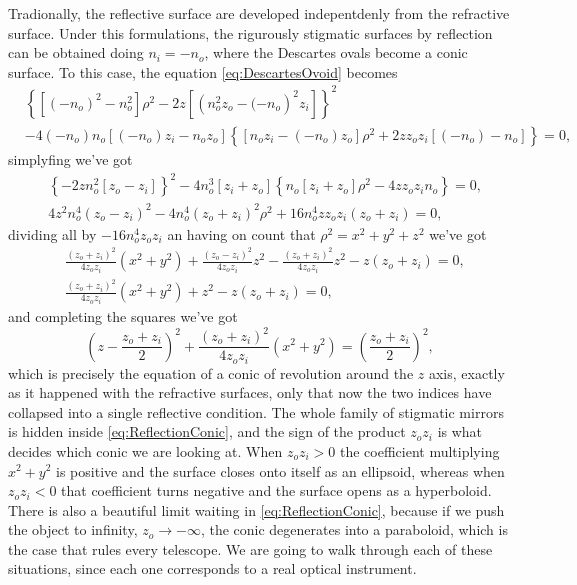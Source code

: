                 Tradionally, the reflective surface are developed indepentdenly from the refractive surface. Under this formulations, the rigurously stigmatic surfaces by reflection can be obtained doing $n_i = -n_o$, where the Descartes ovals become a conic surface. To this case, the equation \ref{eq:DescartesOvoid} becomes
                \begin{align*}
                    & \left\{ \left[\left(-n_o\right)^2-n_o^2 \right]\rho^2 - 2z\left[\left( n_o^2z_o- (-n_o\right)^2z_i  \right] \right\}^2 \\
                    & -4(-n_o)n_o\left[(-n_o)z_i -n_oz_o \right]\left\{\left[n_oz_i - (-n_o)z_o \right]\rho^2 + 2zz_oz_i\left[(-n_o) - n_o \right]  \right\}=0,
                \end{align*}
                simplyfing we've got
                \begin{align*}
                    & \left\{ -2zn_o^2\left[z_o-z_i\right] \right\}^2 -4n_o^3\left[z_i+z_o\right]\left\{n_o\left[z_i+z_o \right]\rho^2 - 4zz_oz_in_o \right\} = 0,\\
                    & 4z^2n_o^4\left(z_o-z_i\right)^2 - 4n_o^4\left(z_o+z_i\right)^2\rho^2 + 16n_o^4zz_oz_i\left(z_o+z_i\right) = 0,
                \end{align*}
                dividing all by $-16n_o^4z_oz_i$ an having on count that $\rho^2 = x^2+y^2+z^2$ we've got
                \begin{align*}
                    & \frac{(z_o+z_i)^2}{4z_oz_i}\left(x^2+y^2\right) + \frac{(z_o-z_i)^2}{4z_oz_i}z^2 - \frac{(z_o+z_i)^2}{4z_oz_i}z^2 - z(z_o+z_i) = 0,\\
                    & \frac{(z_o+z_i)^2}{4z_oz_i}\left(x^2+y^2\right) +z^2 - z(z_o+z_i) = 0,
                \end{align*}
                and completing the squares we've got
                \begin{equation}\label{eq:ReflectionConic}
                    \left(z - \frac{z_o+z_i}{2}\right)^2 + \frac{(z_o+z_i)^2}{4z_oz_i}\left(x^2+y^2\right) = \left(\frac{z_o+z_i}{2}\right)^2,
                \end{equation}
                which is precisely the equation of a conic of revolution around the $z$ axis, exactly as it happened with the refractive surfaces, only that now the two indices have collapsed into a single reflective condition. The whole family of stigmatic mirrors is hidden inside \ref{eq:ReflectionConic}, and the sign of the product $z_oz_i$ is what decides which conic we are looking at. When $z_oz_i>0$ the coefficient multiplying $x^2+y^2$ is positive and the surface closes onto itself as an ellipsoid, whereas when $z_oz_i<0$ that coefficient turns negative and the surface opens as a hyperboloid. There is also a beautiful limit waiting in \ref{eq:ReflectionConic}, because if we push the object to infinity, $z_o\to-\infty$, the conic degenerates into a paraboloid, which is the case that rules every telescope. We are going to walk through each of these situations, since each one corresponds to a real optical instrument.

